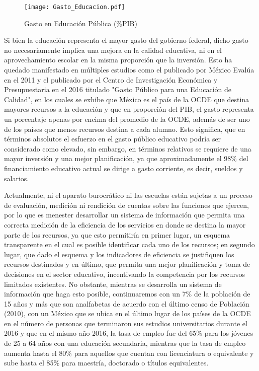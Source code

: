 \begin{figure}[H]
\centering
\texttt{[image: Gasto\_Educacion.pdf]}
\caption{Gasto en Educación Pública (\%PIB)}
\label{Edu}
\end{figure}


Si bien la educación representa el mayor gasto del gobierno federal, dicho gasto no necesariamente implica una mejora en la calidad educativa, ni en el aprovechamiento escolar en la misma proporción que la inversión. Esto ha quedado manifestado en múltiples estudios como el publicado por México Evalúa en el 2011 y el publicado por el Centro de Investigación Económica y Presupuestaria en el 2016 titulado "Gasto Público para una Educación de Calidad", en los cuales se exhibe que México es el país de la OCDE que destina mayores recursos a la educación y que en proporción del PIB, el gasto representa un porcentaje apenas por encima del promedio de la OCDE, además de ser uno de los países que menos recursos destina a cada alumno. Esto significa, que en términos absolutos el esfuerzo en el gasto público educativo podría ser considerado como elevado, sin embargo, en términos relativos se requiere de una mayor inversión y una mejor planificación, ya que aproximadamente el 98\% del financiamiento educativo actual se dirige a gasto corriente, es decir, sueldos y salarios.\bigskip

Actualmente, ni el aparato burocrático ni las escuelas están sujetas a un proceso de evaluación, medición ni rendición de cuentas sobre las funciones que ejercen, por lo que es menester desarrollar un sistema de información que permita una correcta medición de la eficiencia de los servicios en donde se destina la mayor parte de los recursos, ya que esto permitiría en primer lugar, un esquema transparente en el cual es posible identificar cada uno de los recursos; en segundo lugar, que dado el esquema y los indicadores de eficiencia se justifiquen los recursos destinados y en último, que permita una mejor planificación y toma de decisiones en el sector educativo, incentivando  la competencia por los recursos limitados existentes. No obstante, mientras se desarrolla un sistema de información que haga esto posible, continuaremos con un 7\% de la población de 15 años y más que son analfabetas de acuerdo con el último censo de Población (2010), con un México que se ubica en el último lugar de los países de la OCDE en el número de personas que terminaron sus estudios universitarios durante el 2016 y que en el mismo año 2016, la tasa de empleo fue del 65\% para los jóvenes de 25 a 64 años con una educación secundaria, mientras que la tasa de empleo aumenta hasta el 80\% para aquellos que cuentan con licenciatura o equivalente y sube hasta el 85\% para maestría, doctorado o títulos equivalentes.\bigskip

